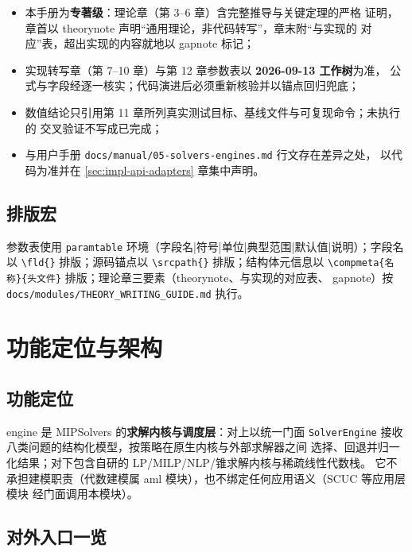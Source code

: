 \documentclass{ctexart}
\begin{document}
\begin{itemize}
  \item 本手册为\textbf{专著级}：理论章（第 3--6 章）含完整推导与关键定理的严格
        证明，章首以 theorynote 声明``通用理论，非代码转写''，章末附``与实现的
        对应''表，超出实现的内容就地以 gapnote 标记；
  \item 实现转写章（第 7--10 章）与第 12 章参数表以 \textbf{2026-09-13 工作树}为准，
        公式与字段经逐一核实；代码演进后必须重新核验并以锚点回归兜底；
  \item 数值结论只引用第 11 章所列真实测试目标、基线文件与可复现命令；未执行的
        交叉验证不写成已完成；
  \item 与用户手册 \texttt{docs/manual/05-solvers-engines.md} 行文存在差异之处，
        以代码为准并在 \ref{sec:impl-api-adapters} 章集中声明。
\end{itemize}

\subsection{排版宏}

参数表使用 \texttt{paramtable} 环境（字段名|符号|单位|典型范围|默认值|说明）；字段名以
\verb|\fld{}| 排版；源码锚点以 \verb|\srcpath{}| 排版；结构体元信息以
\verb|\compmeta{名称}{头文件}| 排版；理论章三要素（theorynote、与实现的对应表、
gapnote）按 \texttt{docs/modules/THEORY\_WRITING\_GUIDE.md} 执行。

\section{功能定位与架构}

\subsection{功能定位}

engine 是 MIPSolvers 的\textbf{求解内核与调度层}：对上以统一门面
\texttt{SolverEngine} 接收八类问题的结构化模型，按策略在原生内核与外部求解器之间
选择、回退并归一化结果；对下包含自研的 LP/MILP/NLP/锥求解内核与稀疏线性代数栈。
它不承担建模职责（代数建模属 aml 模块），也不绑定任何应用语义（SCUC 等应用层模块
经门面调用本模块）。

\subsection{对外入口一览}
\end{document}
